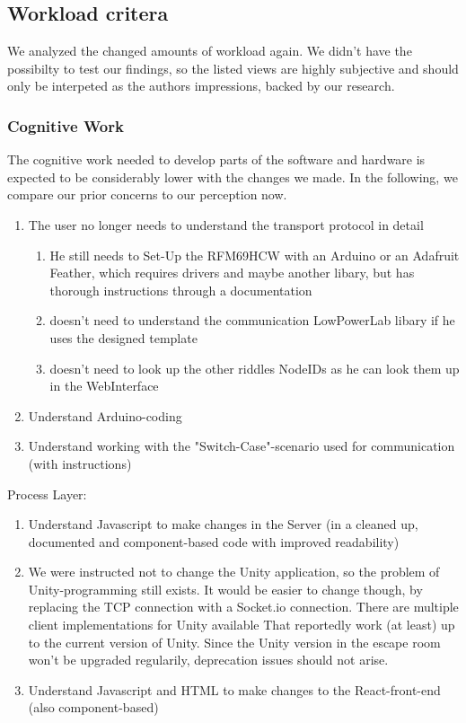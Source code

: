 \subsection{Workload critera}
We analyzed the changed amounts of workload again. 
We didn't have the possibilty to test our findings, so the listed views are highly subjective 
and should only be interpeted as the authors impressions, backed by our research.
\subsubsection{Cognitive Work}
The cognitive work needed to develop parts 
of the software and hardware is expected to be considerably lower with the changes we made.
In the following, we compare our prior concerns to our perception now.
\begin{enumerate}
    \item The user no longer needs to understand the transport protocol in detail
    \begin{enumerate}
        \item 
        He still needs to Set-Up the RFM69HCW with an Arduino or an Adafruit Feather, 
        which requires drivers and maybe another libary, but has thorough instructions through a documentation
        \item doesn't need to understand the communication LowPowerLab libary if he uses the designed template
        \item doesn't need to look up the other riddles NodeIDs as he can look them up in the WebInterface
    \end{enumerate}   
    \item Understand Arduino-coding 
    \item Understand working with the "Switch-Case"-scenario used for communication (with instructions)
\end{enumerate}  
Process Layer:
\begin{enumerate}
    \item Understand Javascript to make changes in the Server (in a cleaned up, documented and component-based code with improved readability)
    \item 
    We were instructed not to change the Unity application, so the problem of Unity-programming still exists. 
    It would be easier to change though, by replacing the TCP connection with a Socket.io connection. 
    There are multiple client implementations for Unity available \parencite{socketioUnity1, socketioUnity2,socketioUnity3}
    That reportedly work (at least) up to the current version of Unity. 
    Since the Unity version in the escape room won't be upgraded regularily, deprecation issues should not arise.
    \item Understand Javascript and HTML to make changes to the React-front-end (also component-based) 
\end{enumerate}  
